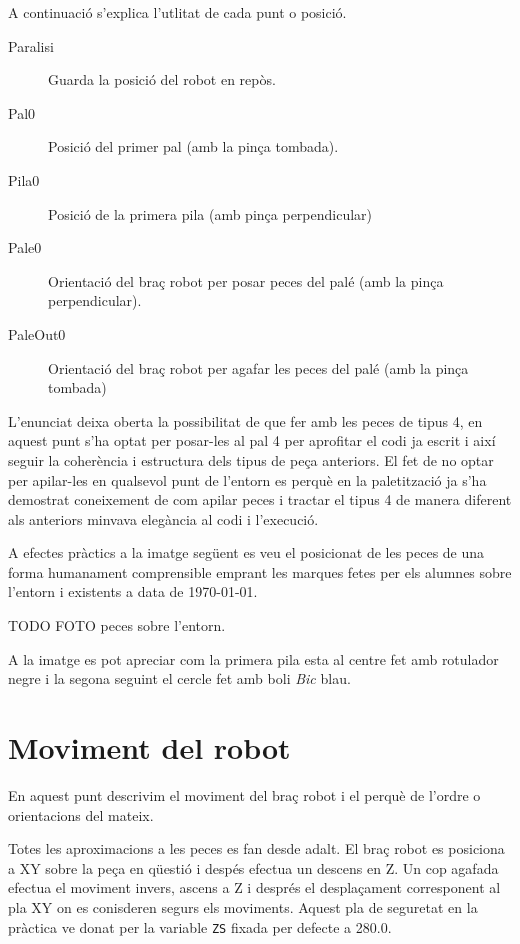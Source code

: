 A continuació s'explica l'utlitat de cada punt o posició.

\begin{description}
 \item [Paralisi] Guarda la posició del robot en repòs.
 \item [Pal0] Posició del primer pal (amb la pinça tombada).
 \item [Pila0] Posició de la primera pila (amb pinça perpendicular)
 \item [Pale0] Orientació del braç robot per posar peces del palé (amb la pinça
perpendicular).
 \item [PaleOut0] Orientació del braç robot per agafar les peces del palé
(amb la pinça tombada) 
\end{description}

L'enunciat deixa oberta la possibilitat de que fer amb les peces de
tipus 4, en aquest punt s'ha optat per posar-les al pal 4 per aprofitar el codi ja escrit i
així seguir la coherència i estructura dels tipus de peça anteriors. El fet de
no optar per apilar-les en qualsevol punt de l'entorn es perquè en la paletització
ja s'ha demostrat coneixement de com apilar peces i tractar el tipus 4 de manera
diferent als anteriors minvava elegància al codi i l'execució.

A efectes pràctics a la imatge següent es veu el posicionat de les peces de una forma
humanament comprensible emprant les marques fetes per els alumnes sobre l'entorn i existents
a data de \today. 

TODO FOTO peces sobre l'entorn.

A la imatge es pot apreciar com la primera pila esta al centre fet amb
rotulador negre i la segona seguint el cercle fet amb boli \emph{Bic} blau.

\section{Moviment del robot}
En aquest punt descrivim el moviment del braç robot i el perquè de l'ordre o
orientacions del mateix.

Totes les aproximacions a les peces es fan desde adalt. El braç robot es posiciona
a XY sobre la peça en qüestió i despés efectua un descens en Z. Un cop agafada
efectua el moviment invers, ascens a Z i després el desplaçament corresponent
al pla XY on es conisderen segurs els moviments. Aquest pla de seguretat
en la pràctica ve donat per la variable \texttt{ZS} fixada per defecte
a 280.0.

